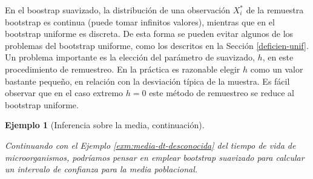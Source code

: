 \documentclass[
  10pt,
]{book}
\theoremstyle{break}
\newtheorem{example}{Ejemplo}[chapter]
\theoremstyle{nonumberplain}
\begin{document}
En el boostrap suavizado, la distribución de una observación \(X_i^{\ast}\) de la remuestra bootstrap es continua (puede tomar infinitos valores), mientras que en el bootstrap uniforme es discreta.
De esta forma se pueden evitar algunos de los problemas del bootstrap uniforme, como los descritos en la Sección \ref{deficien-unif}.
Un problema importante es la elección del parámetro de suavizado, \(h\), en este procedimiento de remuestreo.
En la práctica es razonable elegir \(h\) como un valor bastante pequeño, en relación con la desviación típica de la muestra.
Es fácil observar que en el caso extremo \(h=0\) este método de remuestreo se reduce al bootstrap uniforme.

\begin{example}[Inferencia sobre la media, continuación]
\protect\hypertarget{exm:media-suav}{}\label{exm:media-suav}

Continuando con el Ejemplo \ref{exm:media-dt-desconocida} del tiempo de vida de microorganismos, podríamos pensar en emplear bootstrap suavizado para calcular un intervalo de confianza para la media poblacional.


\end{example}
\end{document}
